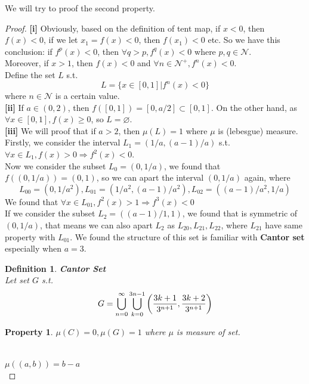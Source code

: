 \documentclass[12pt]{article}
\theoremstyle{plain}
\newtheorem{definition}{{\color{red}\textbf{Definition}}}[section]
\newtheorem{property}{\textbf{Property}}[section]
\newtheorem{proof}{\textit{PROOF}}[section]
\begin{document}
We will try to proof the second property.
{\color{blue}
\begin{proof} \textbf{[i]} Obviously, based on the definition of tent map, if $x < 0$, then $f(x) < 0$, if we let $x_1 = f(x) < 0$, then $f(x_1) < 0$ etc. So we have this conclusion: if $f^p(x) < 0$, then $\forall q > p, f^q(x) < 0$ where $p, q \in \mathcal N$.
\\\noindent Moreover, if $x > 1$, then $f(x) < 0$ and $\forall n \in \mathcal N^+, f^n(x) < 0$.
\\[1ex]\noindent Define the set $L$ s.t.
$$
L = \{x \in [0, 1] | f^n(x) < 0\}
$$
where $n\in \mathcal N$ is a certain value.
\\\noindent \textbf{[ii]} If $a \in (0, 2)$, then $f([0, 1]) = [0, a/2] \subset [0, 1]$. On the other hand, as $\forall x \in [0, 1], f(x) \geq 0$, so $L = \varnothing$.
\\\noindent \textbf{[iii]} We will proof that if $a > 2$, then $\mu(L) = 1$ where $\mu$ is (lebesgue) measure. Firstly, we consider the interval $L_1 = (1/a, (a-1)/a)$ s.t. $\forall x \in L_1, f(x) > 0 \Rightarrow f^2(x) < 0$.
\\\noindent Now we consider the subset $L_0 = (0, 1/a)$, we found that $f\left((0, 1/a)\right) = (0, 1)$, so we can apart the interval $(0, 1/a)$ again, where 
$$
L_{00} = (0, 1/a^2), L_{01} = (1/a^2, (a-1)/a^2) , L_{02} = ((a-1)/a^2, 1/a)
$$
We found that $\forall x \in L_{01}, f^2(x) > 1 \Rightarrow f^3(x) < 0$
\\\noindent If we consider the subset $L_{2} = ((a-1)/1, 1)$, we found that is symmetric of $(0, 1/a)$, that means we can also apart $L_2$ as $L_{20}, L_{21}, L_{22}$, where $L_{21}$ have same property with $L_{01}$. We found the structure of this set is familiar with \textbf{Cantor set} especially when $a = 3$.

{\color{black}
\newpage
\begin{definition}\textbf{Cantor Set}
\\\noindent Let set $G$ s.t. 
$$
G = \bigcup_{n = 0}^{\infty}\bigcup_{k = 0}^{3n-1}\left({3k+1\over 3^{n+1}}, {3k+2\over 3^{n+1}}\right)
$$
\end{definition}

\begin{property} $\mu(C) = 0, \mu(G) = 1$ where $\mu$ is measure of set.
\end{property}
\\\noindent $\mu\left((a, b)\right) = b-a$  
\\\noindent {}

}
\end{proof}}
\end{document}
